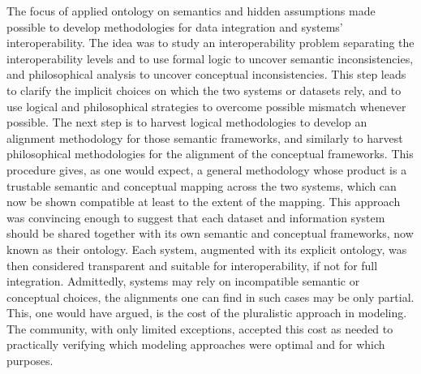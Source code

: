 \documentclass[ao]{iosart2x}
\newcommand{\nb}[1]{\textcolor{red}{$|$}\marginpar{\hspace*{-0cm}\parbox{20mm}{\scriptsize\raggedright\textcolor{red}{#1}}}}
\begin{document}
The focus of applied ontology on semantics and hidden assumptions made possible to develop methodologies for data integration and systems' interoperability. The idea was to study an interoperability problem separating the interoperability levels and to use formal logic to uncover semantic inconsistencies, and philosophical analysis to uncover conceptual inconsistencies. 
This step leads to clarify the implicit choices on which the two systems or datasets rely, and to use logical and philosophical strategies to overcome possible mismatch whenever possible. The next step is to harvest logical methodologies to develop an alignment methodology for those semantic frameworks, and similarly to harvest philosophical methodologies for the alignment of the conceptual frameworks. 
This procedure gives, as one would expect, a general methodology whose product is a trustable semantic and conceptual mapping across the two systems, which can now be shown compatible at least to the extent of the mapping.
This approach was convincing enough to suggest that each dataset and information system should be shared together with its own semantic and conceptual frameworks, now known as their ontology. Each system, augmented with its explicit ontology, was then considered transparent and suitable for interoperability, if not for full integration. 
Admittedly, systems may rely on incompatible semantic or conceptual choices, the alignments one can find in such cases may be only partial. This, one would have argued, is the cost of the pluralistic approach in modeling. The community, with only limited exceptions, accepted this cost as needed to practically verifying which modeling approaches were optimal and for which purposes.
\end{document}
